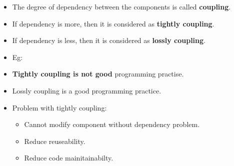 \setlength{\columnsep}{3pt}
\begin{flushleft}
	
	\begin{itemize}
		\item The degree of dependency between the components is called \textbf{coupling}.
		\item If dependency is more, then it is considered as \textbf{tightly coupling}.
		\item If dependency is less, then it is considered as \textbf{lossly coupling}.
		\item Eg:

		\item \textbf{Tightly coupling is not good} programming practise.
		\item Lossly coupling is a good programming practice.
		\newpage
		\item Problem with tightly coupling:
		\begin{itemize}
			\item Cannot modify component without dependency problem.
			\item Reduce reuseability. 
			\item Reduce code mainitainabilty.
		\end{itemize}
	
	\end{itemize}	
	
\end{flushleft}
